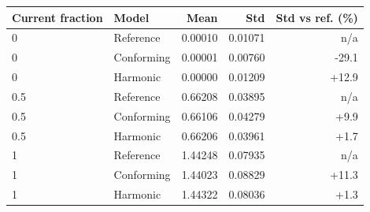 \begin{tabular}{llrrr}\toprule
Current fraction & Model & Mean & Std & Std vs ref. (\%)\\\midrule
0 & Reference & 0.00010 & 0.01071 & n/a \\
0 & Conforming & 0.00001 & 0.00760 & -29.1 \\
0 & Harmonic & 0.00000 & 0.01209 & +12.9 \\
0.5 & Reference & 0.66208 & 0.03895 & n/a \\
0.5 & Conforming & 0.66106 & 0.04279 & +9.9 \\
0.5 & Harmonic & 0.66206 & 0.03961 & +1.7 \\
1 & Reference & 1.44248 & 0.07935 & n/a \\
1 & Conforming & 1.44023 & 0.08829 & +11.3 \\
1 & Harmonic & 1.44322 & 0.08036 & +1.3 \\
\bottomrule\end{tabular}
